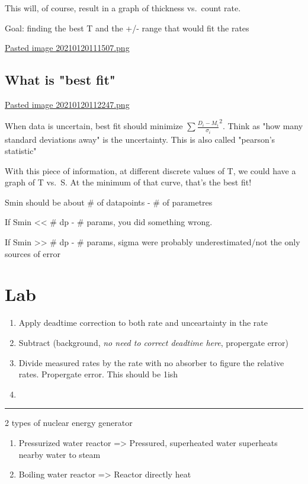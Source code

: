\documentclass[letterpaper]{article}
\begin{document}
This will, of course, result in a graph of thickness vs. count rate.

Goal: finding the best T and the +/- range that would fit the rates

\href{Pasted image 20210120111507.png.org}{Pasted image
20210120111507.png}

\subsection{What is "best fit"}
\label{sec:org439032c}
\href{Pasted image 20210120112247.png.org}{Pasted image
20210120112247.png}

When data is uncertain, best fit should minimize
\(\sum \frac{D_i-M_i}{\sigma_i}^2\). Think as "how many standard
deviations away" is the uncertainty. This is also called "pearson's
statistic"

With this piece of information, at different discrete values of T, we
could have a graph of T vs. S. At the minimum of that curve, that's the
best fit!

Smin should be about \# of datapoints - \# of parametres

If Smin << \# dp - \# params, you did something wrong.

If Smin >> \# dp - \# params, sigma were probably underestimated/not the
only sources of error

\section{Lab}
\label{sec:orgc5396bf}
\begin{enumerate}
\item Apply deadtime correction to both rate and unceartainty in the rate
\item Subtract (background, \emph{no need to correct deadtime here}, propergate
error)
\item Divide measured rates by the rate with no absorber to figure the
relative rates. Propergate error. This should be 1ish
\item 
\end{enumerate}

\noindent\rule{\textwidth}{0.5pt}

2 types of nuclear energy generator

\begin{enumerate}
\item Pressurized water reactor => Pressured, superheated water superheats
nearby water to steam
\item Boiling water reactor => Reactor directly heat
\end{enumerate}
\end{document}
